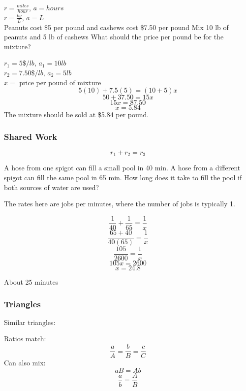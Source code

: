 \documentclass[letterpaper,12pt,fleqn]{article}
\renewcommand{\o}{\theta}
\begin{document}
$r=\frac{miles}{hour}$, $a=hours$ \\
$r=\frac{kg}{L}$, $a=L$ \\

Peanuts cost \$5 per pound and cashews cost \$7.50 per pound
Mix 10 lb of peanuts and 5 lb of cashews
What should the price per pound be for the mixture?

$r_1=5 \$/lb$, $a_1=10 lb$ \\
$r_2=7.50 \$/lb$, $a_2=5 lb$ \\
$x=$ price per pound of mixture \\
\[5(10)+7.5(5)=(10+5)x\]
\[50+37.50=15x\]
\[15x=87.50\]
\[x=5.84\]
The mixture should be sold at \$5.84 per pound.

\subsubsection*{Shared Work}

\[r_1+r_2=r_3\]

A hose from one spigot can fill a small pool in 40 min. A hose from a
different spigot can fill the same pool in 65 min. How long does it take to
fill the pool if both sources of water are used?

The rates here are jobs per minutes, where the number of jobs is typically 1.

\[\frac{1}{40}+\frac{1}{65}=\frac{1}{x}\]
\[\frac{65+40}{40(65)}=\frac{1}{x}\]
\[\frac{105}{2600}=\frac{1}{x}\]
\[105x=2600\]
\[x=24.8\]

About 25 minutes

\subsubsection*{Triangles}

Similar triangles:

\begin{minipage}[t]{3in}
\end{minipage}
\begin{minipage}[t]{3in}
\end{minipage}
\newpage
Ratios match:
\[\frac{a}{A}=\frac{b}{B}=\frac{c}{C}\]
Can also mix:
\[aB=Ab\]
\[\frac{a}{b}=\frac{A}{B}\]
\end{document}

